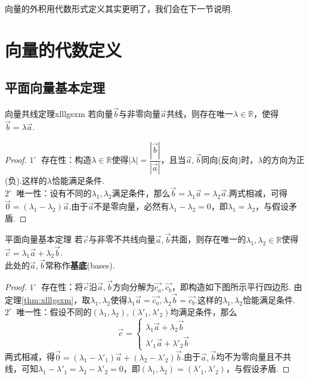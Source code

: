 \documentclass[lang=cn, zihao=5]{elegantbook}
\newcommand{\R}{\mathbb{R}}
\newcommand{\buzhou}[1]{$#1^{\circ} \ $}
\begin{document}

向量的外积用代数形式定义其实更明了，我们会在下一节说明.

\section{向量的代数定义}

\subsection{平面向量基本定理}

\begin{theorem}{向量共线定理}{xlllgsxm}
	若向量$\vec{b}$与非零向量$\vec{a}$共线，则存在唯一$\lambda \in \R$，使得$\vec{b} = \lambda \vec{a}$.
\end{theorem}
\begin{proof}
	\buzhou{1} 存在性：构造$\lambda \in \R$使得$|\lambda | = \dfrac{|\vec{b}|}{|\vec{a}|}$，且当$\vec{a},\vec{b}$同向(反向)时，$\lambda$的方向为正(负).这样的$\lambda$恰能满足条件. \\
	\buzhou{2} 唯一性：设有不同的$\lambda _1,\lambda _2$满足条件，那么$\vec{b} = \lambda _1 \vec{a} = \lambda _2 \vec{a}$.两式相减，可得$\vec{0}=(\lambda _1 - \lambda _2)\vec{a}$.由于$\vec{a}$不是零向量，必然有$\lambda _1 - \lambda _2=0$，即$\lambda _1=\lambda _2$，与假设矛盾.
\end{proof}

\begin{theorem}{平面向量基本定理}
	若$\vec{c}$与非零不共线向量$\vec{a},\vec{b}$共面，则存在唯一的$\lambda _1,\lambda _2 \in \R$使得$\vec{c} = \lambda _1 \vec{a} + \lambda _2 \vec{b}$. \\
	此处的$\vec{a},\vec{b}$常称作\textbf{基底}(bases).
\end{theorem}
\begin{proof}
	\buzhou{1} 存在性：将$\vec{c}$沿$\vec{a},\vec{b}$方向分解为$\vec{c_a},\vec{c_b}$，即构造如下图所示平行四边形.
	由定理\ref{thm:xlllgsxm}，取$\lambda _1,\lambda _2$使得$\lambda _1 \vec{a}=\vec{c_a}, \lambda _2 \vec{b}=\vec{c_b}$.这样的$\lambda _1,\lambda _2$恰能满足条件. \\
	\buzhou{2} 唯一性：假设不同的$(\lambda _1, \lambda _2),(\lambda '_1, \lambda '_2)$均满足条件，那么$$\vec{c}=\begin{cases}
		\lambda _1 \vec{a} + \lambda _2 \vec{b} \\
		\lambda '_1 \vec{a} + \lambda '_2 \vec{b}
	\end{cases}$$
	两式相减，得$\vec{0}=(\lambda _1 - \lambda '_1) \vec{a} + (\lambda _2 - \lambda '_2) \vec{b}$.由于$\vec{a},\vec{b}$均不为零向量且不共线，可知$\lambda _1 - \lambda '_1 = \lambda _2 - \lambda '_2 = 0$，即$(\lambda _1, \lambda _2)=(\lambda '_1, \lambda '_2)$，与假设矛盾.
\end{proof}
\end{document}
